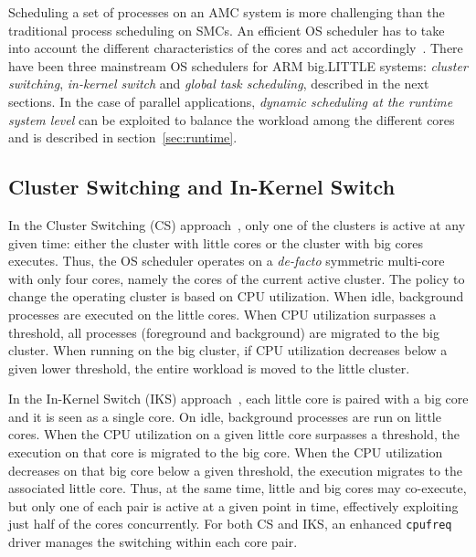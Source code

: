 Scheduling a set of processes on an AMC system is more challenging than the traditional process scheduling on SMCs. 
An efficient OS scheduler has to take into account the different characteristics of the cores and act accordingly~\cite{coolingAware}.
There have been three mainstream OS schedulers for ARM big.LITTLE systems: \textit{cluster switching}, 
\textit{in-kernel switch} and \textit{global task scheduling}, described in the next sections.
In the case of parallel applications, \textit{dynamic scheduling at the runtime system level} can be exploited to balance the workload among the different cores and is described in section~\ref{sec:runtime}.


\subsection{Cluster Switching and In-Kernel Switch}
In the Cluster Switching (CS) approach~\cite{samsung}, only one of the clusters is active at any given time: either the cluster with little cores or the cluster with big cores executes. Thus, the OS scheduler operates on a \emph{de-facto} symmetric multi-core with only four cores, namely the cores of the current active cluster. The policy to change the operating cluster is based on CPU utilization. When idle, background processes are executed on the little cores. When CPU utilization surpasses a threshold, all processes (foreground and background) are migrated to the big cluster. When running on the big cluster, if CPU utilization decreases below a given lower threshold, the entire workload is moved to the little cluster. 

In the In-Kernel Switch (IKS) approach~\cite{IKS}, each little core is paired with a big core and it is seen as a single core. On idle, background processes are run on little cores. When the CPU utilization on a given little core surpasses a threshold, the execution on that core is migrated to the big core. When the CPU utilization decreases on that big core below a given threshold, the execution migrates to the associated little core. Thus, at the same time, little and big cores may co-execute, but only one of each pair is active at a given point in time, effectively exploiting just half of the cores concurrently. For both CS and IKS, an enhanced \texttt{cpufreq} driver manages the switching within each core pair.

